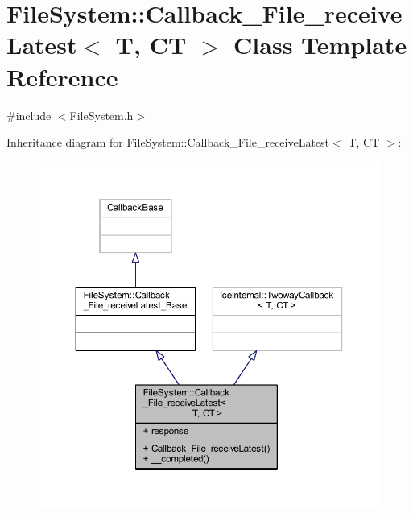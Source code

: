 \hypertarget{class_file_system_1_1_callback___file__receive_latest}{}\section{File\+System\+:\+:Callback\+\_\+\+File\+\_\+receive\+Latest$<$ T, C\+T $>$ Class Template Reference}
\label{class_file_system_1_1_callback___file__receive_latest}


{\ttfamily \#include $<$File\+System.\+h$>$}



Inheritance diagram for File\+System\+:\+:Callback\+\_\+\+File\+\_\+receive\+Latest$<$ T, C\+T $>$\+:
\nopagebreak
\begin{figure}[H]
\begin{center}
\leavevmode
\includegraphics[width=350pt]{class_file_system_1_1_callback___file__receive_latest__inherit__graph}
\end{center}
\end{figure}



